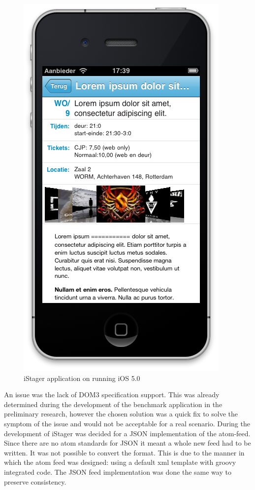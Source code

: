 \begin{figure}
\begin{minipage}{2.2in}
		\includegraphics[scale=0.15]{images/iStager_2.png}
	\end{minipage}%
	\caption{iStager application on running iOS 5.0}%
	\label{fig:1figs}%
\end{figure}
An issue was the lack of DOM3 specification support. This was already determined during the development of the benchmark application in the preliminary research, however the chosen solution was a quick fix to solve the symptom of the issue and would not be acceptable for a real scenario. During the development of iStager was decided for a JSON implementation of the atom-feed. Since there are no atom standards for JSON it meant a whole new feed had to be written. It was not possible to convert the format. This is due to the manner in which the atom feed was designed: using a default xml template with groovy integrated code. The JSON feed implementation was done the same way to preserve consistency.

